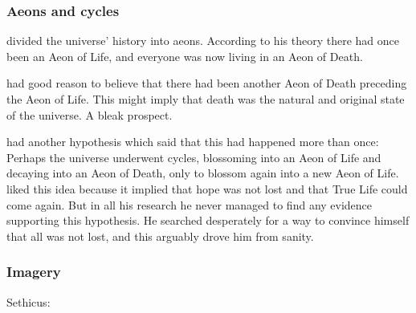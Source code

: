 \subsubsection{Aeons and cycles}
\Sethicus divided the universe' history into aeons. 
According to his theory there had once been an Aeon of Life, and everyone was now living in an Aeon of Death. 

\Sethicus had good reason to believe that there had been another Aeon of Death preceding the Aeon of Life.
This might imply that death was the natural and original state of the universe. 
A bleak prospect. 

\Sethicus had another hypothesis which said that this had happened more than once: 
Perhaps the universe underwent cycles, blossoming into an Aeon of Life and decaying into an Aeon of Death, only to blossom again into a new Aeon of Life. 
\Sethicus liked this idea because it implied that hope was not lost and that True Life could come again.
But in all his research he never managed to find any evidence supporting this hypothesis.
He searched desperately for a way to convince himself that all was not lost, and this arguably drove him from sanity.





\subsubsection{Imagery}
\begin{prose}
  Sethicus:
\end{prose}


